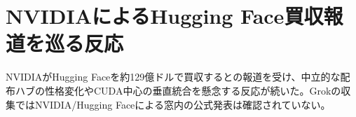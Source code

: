 \section{NVIDIAによるHugging Face買収報道を巡る反応}
NVIDIAがHugging Faceを約129億ドルで買収するとの報道を受け、中立的な配布ハブの性格変化やCUDA中心の垂直統合を懸念する反応が続いた。Grokの収集ではNVIDIA/Hugging Faceによる窓内の公式発表は確認されていない。
